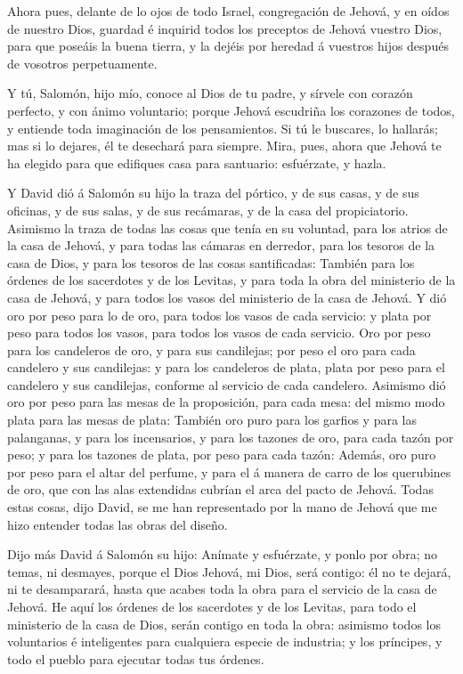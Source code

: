  Ahora pues, delante de lo ojos de todo Israel, congregación
de Jehová, y en oídos de nuestro Dios, guardad é inquirid todos los
preceptos de Jehová vuestro Dios, para que poseáis la buena tierra, y la
dejéis por heredad á vuestros hijos después de vosotros perpetuamente.

 Y tú, Salomón, hijo mío, conoce al Dios de tu padre, y
sírvele con corazón perfecto, y con ánimo voluntario; porque Jehová
escudriña los corazones de todos, y entiende toda imaginación de los
pensamientos. Si tú le buscares, lo hallarás; mas si lo dejares, él te
desechará para siempre.  Mira, pues, ahora que Jehová te ha
elegido para que edifiques casa para santuario: esfuérzate, y hazla.

 Y David dió á Salomón su hijo la traza del pórtico, y de
sus casas, y de sus oficinas, y de sus salas, y de sus recámaras, y de
la casa del propiciatorio.  Asimismo la traza de todas las
cosas que tenía en su voluntad, para los atrios de la casa de Jehová, y
para todas las cámaras en derredor, para los tesoros de la casa de Dios,
y para los tesoros de las cosas santificadas:  También para
los órdenes de los sacerdotes y de los Levitas, y para toda la obra del
ministerio de la casa de Jehová, y para todos los vasos del ministerio
de la casa de Jehová.  Y dió oro por peso para lo de oro,
para todos los vasos de cada servicio: y plata por peso para todos los
vasos, para todos los vasos de cada servicio.  Oro por peso
para los candeleros de oro, y para sus candilejas; por peso el oro para
cada candelero y sus candilejas: y para los candeleros de plata, plata
por peso para el candelero y sus candilejas, conforme al servicio de
cada candelero.  Asimismo dió oro por peso para las mesas
de la proposición, para cada mesa: del mismo modo plata para las mesas
de plata:  También oro puro para los garfios y para las
palanganas, y para los incensarios, y para los tazones de oro, para cada
tazón por peso; y para los tazones de plata, por peso para cada tazón:
 Además, oro puro por peso para el altar del perfume, y
para el á manera de carro de los querubines de oro, que con las alas
extendidas cubrían el arca del pacto de Jehová.  Todas
estas cosas, dijo David, se me han representado por la mano de Jehová
que me hizo entender todas las obras del diseño.

 Dijo más David á Salomón su hijo: Anímate y esfuérzate, y
ponlo por obra; no temas, ni desmayes, porque el Dios Jehová, mi Dios,
será contigo: él no te dejará, ni te desamparará, hasta que acabes toda
la obra para el servicio de la casa de Jehová.  He aquí los
órdenes de los sacerdotes y de los Levitas, para todo el ministerio de
la casa de Dios, serán contigo en toda la obra: asimismo todos los
voluntarios é inteligentes para cualquiera especie de industria; y los
príncipes, y todo el pueblo para ejecutar todas tus órdenes.

